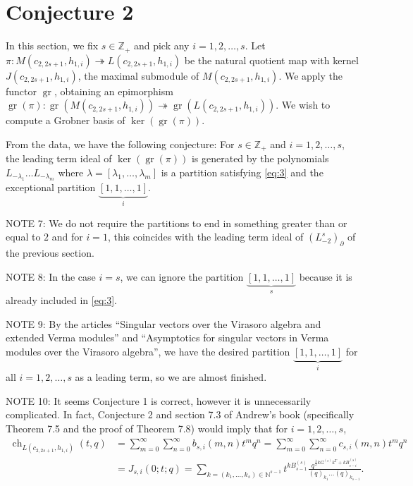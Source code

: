 \documentclass[a4paper, 12pt, reqno]{amsart}
\theoremstyle{remark}
\DeclareMathOperator{\ch}{ch}
\DeclareMathOperator{\gr}{gr}
\begin{document}
\section{Conjecture 2}
\label{sec:conjecture-2}

In this section, we fix $s \in \mathbb{Z}_+$ and pick any $i = 1, 2, \dots, s$.
Let $\pi: M(c_{2, 2s + 1}, h_{1, i}) \twoheadrightarrow L(c_{2, 2s + 1}, h_{1, i})$ be the natural quotient map with kernel $J(c_{2, 2s + 1}, h_{1, i})$, the maximal submodule of $M(c_{2, 2s + 1}, h_{1, i})$.
We apply the functor $\gr$, obtaining an epimorphism $\gr(\pi): \gr(M(c_{2, 2s + 1}, h_{1, i})) \twoheadrightarrow \gr(L(c_{2, 2s + 1}, h_{1, i}))$.
We wish to compute a Grobner basis of $\ker(\gr(\pi))$.

From the data, we have the following conjecture: For $s \in \mathbb{Z}_+$ and $i = 1, 2, \dots, s$, the leading term ideal of $\ker(\gr(\pi))$ is generated by the polynomials $L_{-\lambda_1} \dots L_{-\lambda_m}$ where $\lambda = [\lambda_1, \dots, \lambda_m]$ is a partition satisfying \eqref{eq:3} and the exceptional partition $\underbrace{[1, 1, \dots, 1]}_i$.

NOTE 7: We do not require the partitions to end in something greater than or equal to $2$ and for $i = 1$, this coincides with the leading term ideal of $(L_{-2}^s)_{\partial}$ of the previous section.

NOTE 8: In the case $i = s$, we can ignore the partition $\underbrace{[1, 1, \dots, 1]}_s$ because it is already included in \eqref{eq:3}.

NOTE 9: By the articles ``Singular vectors over the Virasoro algebra and extended Verma modules'' and ``Asymptotics for singular vectors in Verma
modules over the Virasoro algebra'', we have the desired partition $\underbrace{[1, 1, \dots, 1]}_i$ for all $i = 1, 2, \dots, s$ as a leading term, so we are almost finished.

NOTE 10: It seems Conjecture 1 is correct, however it is unnecessarily complicated.
In fact, Conjecture 2 and section 7.3 of Andrew's book (specifically Theorem 7.5 and the proof of Theorem 7.8) would imply that for $i = 1, 2, \dots, s$,
\begin{align*}
  \ch_{L(c_{2, 2s + 1}, h_{1, i})}(t, q) &= \sum_{m = 0}^{\infty}\sum_{n = 0}^{\infty}b_{s, i}(m, n)t^mq^n = \sum_{m = 0}^{\infty}\sum_{n = 0}^{\infty}c_{s, i}(m, n)t^mq^n \\
                                         &= J_{s, i}(0; t; q) = \sum_{k = (k_1, \dots, k_s) \in \mathbb{N}^{s - 1}}t^{kB^{(s)}_{s - 1}}\frac{q^{\frac{1}{2}kG^{(s)}k^T + kB^{(s)}_{s - i}}}{(q)_{k_1}\dots(q)_{k_{s - 1}}}.
\end{align*}
\end{document}
